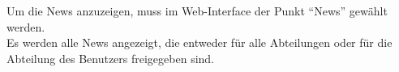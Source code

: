  Um die News anzuzeigen, muss im Web-Interface der Punkt \enquote{News} gewählt werden.
\\
Es werden alle News angezeigt, die entweder für alle Abteilungen oder für die Abteilung des Benutzers freigegeben sind.
